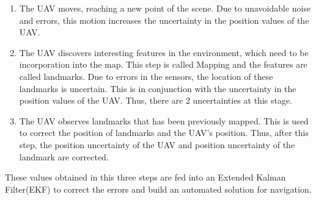 \begin{enumerate}
    \item The UAV moves, reaching a new point of the scene. Due to unavoidable noise and errors, this motion increases the uncertainty in the position values of the UAV.
    
    \item The UAV discovers interesting features in the environment, which need to be incorporation into the map. This step is called Mapping and the features are called landmarks. Due to errors in the sensors, the location of these landmarks is uncertain. This is in conjunction with the uncertainty in the position values of the UAV. Thus, there are 2 uncertainties at this stage.
    
    \item The UAV observes landmarks that has been previously mapped. This is used to correct the position of landmarks and the UAV's position. Thus, after this step, the position uncertainty of the UAV and position uncertainty of the landmark are corrected.
\end{enumerate}

These values obtained in this three steps are fed into an Extended Kalman Filter(EKF) to correct the errors and build an automated solution for navigation.

